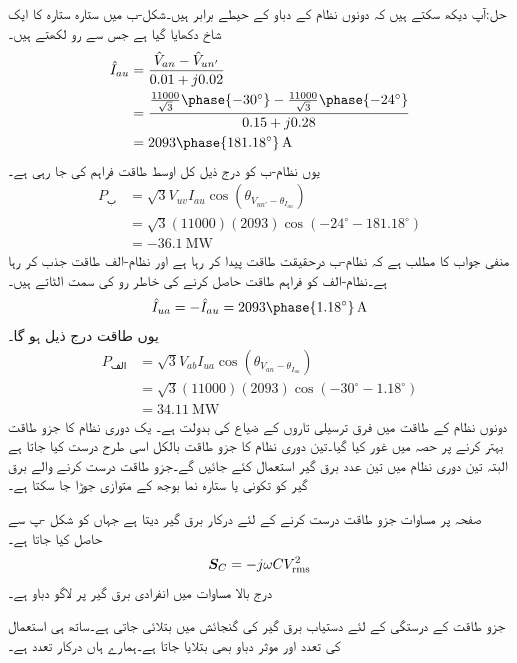 حل:آپ دیکھ سکتے ہیں کہ دونوں نظام کے دباو کے حیطے برابر ہیں۔شکل-ب میں ستارہ ستارہ کا ایک شاخ دکھایا گیا ہے جس سے  رو لکھتے ہیں۔
\begin{align*}
\hat{I}_{au}&=\frac{\hat{V}_{an}-\hat{V}_{un'}}{0.01+j0.02}\\
&=\frac{\frac{11000}{\sqrt{3}}\phase{-30^{\circ}}-\frac{11000}{\sqrt{3}}\phase{-24^{\circ}}}{0.15+j0.28}\\
&=2093\phase{181.18^{\circ}}\,\si{\ampere}
\end{align*}
یوں نظام-ب کو درج ذیل کل اوسط طاقت فراہم کی جا رہی ہے۔
\begin{align*}
P_{\text{ب}}&=\sqrt{3} V_{uv} I_{au} \cos(\theta_{V_{un'}-\theta_{I_{au}}})\\
&=\sqrt{3} (11000)(2093)\cos(-24^{\circ}-181.18^{\circ})\\
&=\SI{-36.1}{\mega\watt}
\end{align*}
منفی جواب کا مطلب ہے کہ نظام-ب درحقیقت طاقت پیدا کر رہا ہے اور نظام-الف طاقت جذب کر رہا ہے۔نظام-الف کو فراہم طاقت حاصل کرنے کی خاطر رو کی سمت الٹاتے ہیں۔
\begin{align*}
\hat{I}_{ua}=-\hat{I}_{au}=2093\phase{1.18^{\circ}}\,\si{\ampere}
\end{align*}
یوں طاقت درج ذیل ہو گا۔
\begin{align*}
P_{\text{الف}}&=\sqrt{3} V_{ab} I_{ua} \cos(\theta_{V_{an}-\theta_{I_{ua}}})\\
&=\sqrt{3} (11000)(2093)\cos(-30^{\circ}-1.18^{\circ})\\
&=\SI{34.11}{\mega\watt}
\end{align*}
دونوں نظام کے طاقت میں فرق ترسیلی تاروں کے ضیاع کی بدولت ہے۔ 
یک دوری نظام کا جزو طاقت بہتر کرنے پر  حصہ  میں غور کیا گیا۔تین دوری نظام کا جزو طاقت بالکل اسی طرح درست کیا جاتا ہے البتہ تین دوری نظام میں تین عدد برق گیر استعمال کئے جائیں گے۔جزو طاقت درست کرنے والے برق گیر کو تکونی یا ستارہ نما بوجھ کے متوازی جوڑا جا سکتا ہے۔

صفحہ  پر مساوات  جزو طاقت درست کرنے کے لئے درکار برق گیر دیتا ہے جہاں  کو شکل -پ سے حاصل کیا جاتا ہے۔
\begin{align*}
{\ensuremath{{\boldsymbol{S}}}}_C=-j \omega C {V^2_{\textup{rms}}}
\end{align*}
درج بالا مساوات میں  انفرادی برق گیر پر لاگو دباو ہے۔

جزو طاقت کے درستگی کے لئے دستیاب برق گیر کی گنجائش  میں بتلائی جاتی ہے۔ساتھ ہی  استعمال کی تعدد اور موثر دباو بھی بتلایا جاتا ہے۔ہمارے ہاں  درکار تعدد ہے۔

